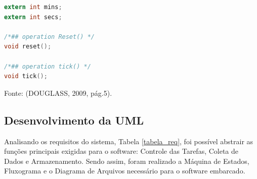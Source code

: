 \newpage
\renewcommand{\lstlistingname}{Código}


\begin{lstlisting}[caption={Transcrição do Timer UML para código em C.},label={lst:codigo3},language=C]
extern int mins; 
extern int secs;

/*## operation Reset() */
void reset();

/*## operation tick() */
void tick();

\end{lstlisting}
\begin{center}
Fonte: (DOUGLASS, 2009, pág.5).
\end{center}

\subsection{Desenvolvimento da UML}

Analisando os requisitos do sistema, Tabela \ref{tabela_req}, foi possível abstrair as funções principais exigidas para o software: Controle das Tarefas, Coleta de Dados e Armazenamento. Sendo assim, foram realizado a Máquina de Estados, Fluxograma e o Diagrama de Arquivos necessário para o software embarcado. 

